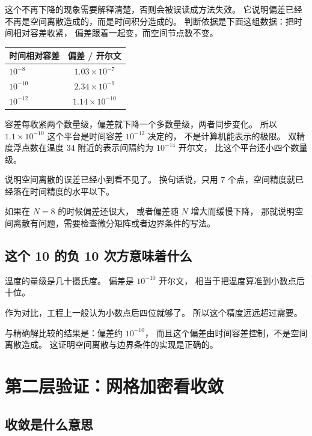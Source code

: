 这个不再下降的现象需要解释清楚，否则会被误读成方法失效。
它说明偏差已经不再是空间离散造成的，而是时间积分造成的。
判断依据是下面这组数据：把时间相对容差收紧，
偏差跟着一起变，而空间节点数不变。

\begin{center}
\begin{tabular}{@{}lc@{}}
\toprule
时间相对容差 & 偏差 / 开尔文 \\
\midrule
$10^{-8}$ & $1.03\times10^{-7}$ \\
$10^{-10}$ & $2.34\times10^{-9}$ \\
$10^{-12}$ & $1.14\times10^{-10}$ \\
\bottomrule
\end{tabular}
\end{center}

容差每收紧两个数量级，偏差就下降一个多数量级，两者同步变化。
所以 $1.1\times10^{-10}$ 这个平台是时间容差 $10^{-12}$ 决定的，
不是计算机能表示的极限。
双精度浮点数在温度 $34$ 附近的表示间隔约为 $10^{-14}$ 开尔文，
比这个平台还小四个数量级。

说明空间离散的误差已经小到看不见了。
换句话说，只用 $7$ 个点，空间精度就已经落在时间精度的水平以下。

如果在 $N=8$ 的时候偏差还很大，
或者偏差随 $N$ 增大而缓慢下降，
那就说明空间离散有问题，需要检查微分矩阵或者边界条件的写法。

\subsection{这个 10 的负 10 次方意味着什么}

温度的量级是几十摄氏度。
偏差是 $10^{-10}$ 开尔文，
相当于把温度算准到小数点后十位。

作为对比，工程上一般认为小数点后四位就够了。
所以这个精度远远超过需要。

\keypoint
与精确解比较的结果是：偏差约 $10^{-10}$，
而且这个偏差由时间容差控制，不是空间离散造成。
这证明空间离散与边界条件的实现是正确的。

\section{第二层验证：网格加密看收敛}

\subsection{收敛是什么意思}

